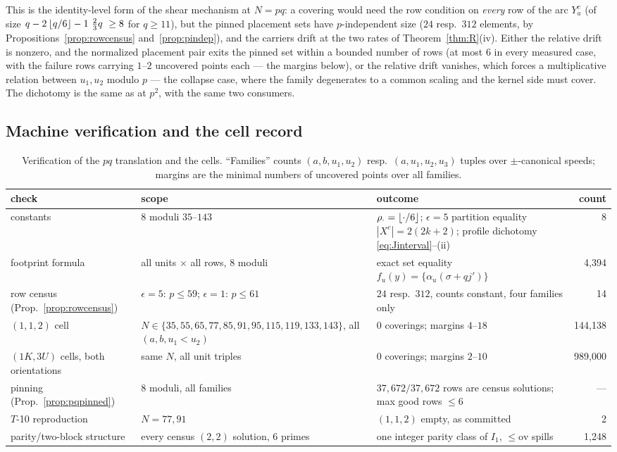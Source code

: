 This is the identity-level form of the shear mechanism at $N=pq$: a covering
would need the row condition on \emph{every} row of the arc $Y_a^{c}$ (of
size $q-2\left\lfloor q/6 \right\rfloor-1\ \tfrac23 q\ \ge 8$ for $q\ge11$), but the pinned
placement sets have $p$-independent size ($24$ resp.\ $312$ elements, by
Propositions~\ref{prop:rowcensus} and~\ref{prop:pindep}), and the carriers
drift at the two rates of Theorem~\ref{thm:R}(iv). Either the relative drift
is nonzero, and the normalized placement pair exits the pinned set within a
bounded number of rows (at most $6$ in every measured case, with the failure
rows carrying $1$--$2$ uncovered points each --- the margins below), or the
relative drift vanishes, which forces a multiplicative relation between
$u_1,u_2$ modulo $p$ --- the collapse case, where the family degenerates to a
common scaling and the kernel side must cover. The dichotomy is the same as
at $p^2$, with the same two consumers.

\subsection{Machine verification and the cell record}\label{sec:pq-verify}

\begin{table}[t]
\centering
\small
\caption{Verification of the $pq$ translation and the cells. ``Families''
counts $(a,b,u_1,u_2)$ resp.\ $(a,u_1,u_2,u_3)$ tuples over $\pm$-canonical
speeds; margins are the minimal numbers of uncovered points over all
families.}
\label{tab:pqverify}
\begin{tabularx}{\textwidth}{@{}lXXr@{}}
\toprule
check & scope & outcome & count \\
\midrule
constants & $8$ moduli $35$--$143$ & $\rho_\cdot=\left\lfloor \cdot/6 \right\rfloor$;
$\epsilon{=}5$ partition equality $|X^c|=2(2k{+}2)$; profile dichotomy
\eqref{eq:Jinterval}--(ii) & 8 \\
footprint formula & all units $\times$ all rows, $8$ moduli & exact set
equality $f_u(y)=\{\alpha_u(\sigma+qj')\}$ & 4{,}394 \\
row census (Prop.~\ref{prop:rowcensus}) & $\epsilon=5$: $p\le59$;
$\epsilon=1$: $p\le61$ & $24$ resp.\ $312$, counts constant, four families
only & 14 \\
$(1,1,2)$ cell & $N\in\{35,55,65,77,85,91,95,115,119,133,143\}$, all $(a,b,u_1<u_2)$ & $0$
coverings; margins $4$--$18$ & 144{,}138 \\
$(1K,3U)$ cells, both orientations & same $N$, all unit triples & $0$
coverings; margins $2$--$10$ & 989{,}000 \\
pinning (Prop.~\ref{prop:pqpinned}) & $8$ moduli, all families & $37{,}672/
37{,}672$ rows are census solutions; max good rows $\le6$ & --- \\
$T$-10 reproduction & $N=77,91$ & $(1,1,2)$ empty, as committed & 2 \\
parity/two-block structure & every census $(2,2)$ solution, $6$ primes &
one integer parity class of $I_1$, $\le\mathrm{ov}$ spills & 1{,}248 \\
\bottomrule
\end{tabularx}
\end{table}

